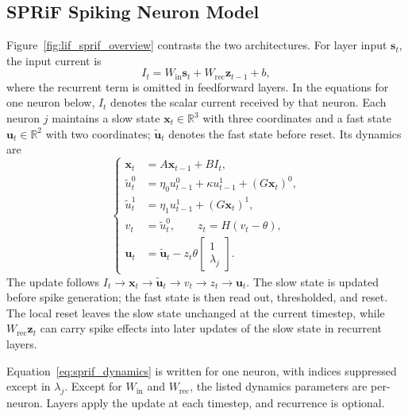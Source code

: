 \documentclass[letterpaper]{article} %
\begin{document}
\subsection{SPRiF Spiking Neuron Model}

Figure~\ref{fig:lif_sprif_overview} contrasts the two architectures. For layer input $\mathbf{s}_t$, the input current is
\begin{equation}
I_t=W_{\mathrm{in}}\mathbf{s}_t+W_{\mathrm{rec}}\mathbf{z}_{t-1}+b,
\label{eq:input_current}
\end{equation}
where the recurrent term is omitted in feedforward layers. In the equations for one neuron below, $I_t$ denotes the scalar current received by that neuron. Each neuron $j$ maintains a slow state $\mathbf{x}_t\in\mathbb{R}^{3}$ with three coordinates and a fast state $\mathbf{u}_t\in\mathbb{R}^{2}$ with two coordinates; $\widetilde{\mathbf{u}}_t$ denotes the fast state before reset. Its dynamics are
\begin{equation}
\left\{
\begin{aligned}
\mathbf{x}_t &= A\mathbf{x}_{t-1}+B I_t,\\
\widetilde{u}_t^0 &= \eta_0 u_{t-1}^0+\kappa u_{t-1}^1+(G\mathbf{x}_t)^0,\\
\widetilde{u}_t^1 &= \eta_1 u_{t-1}^1+(G\mathbf{x}_t)^1,\\
v_t &= \widetilde{u}_t^0,\qquad z_t=H(v_t-\theta),\\
\mathbf{u}_t &= \widetilde{\mathbf{u}}_t-z_t\theta
\begin{bmatrix}1\\\lambda_j\end{bmatrix}.
\end{aligned}
\right.
\label{eq:sprif_dynamics}
\end{equation}
The update follows $I_t\rightarrow\mathbf{x}_t\rightarrow\widetilde{\mathbf{u}}_t\rightarrow v_t\rightarrow z_t\rightarrow\mathbf{u}_t$. The slow state is updated before spike generation; the fast state is then read out, thresholded, and reset. The local reset leaves the slow state unchanged at the current timestep, while $W_{\mathrm{rec}}\mathbf{z}_t$ can carry spike effects into later updates of the slow state in recurrent layers.

Equation~\eqref{eq:sprif_dynamics} is written for one neuron, with indices suppressed except in $\lambda_j$. Except for $W_{\mathrm{in}}$ and $W_{\mathrm{rec}}$, the listed dynamics parameters are per-neuron. Layers apply the update at each timestep, and recurrence is optional.
\end{document}
